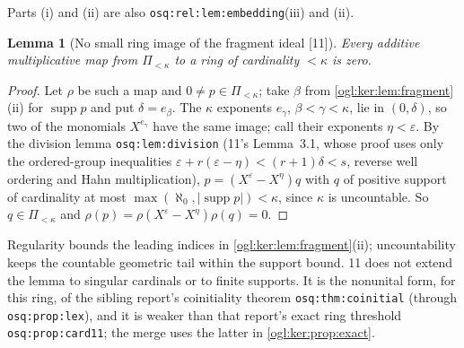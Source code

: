 \documentclass[11pt,oneside]{article}
\numberwithin{equation}{section}
\newtheorem{lemma}[lemma]{Lemma}
\theoremstyle{definition}
\theoremstyle{remark}
\newcommand{\supp}{\operatorname{supp}}
\newcommand{\src}[1]{\textup{\textsf{\small[#1]}}}
\newcommand{\replabel}[1]{\nolinkurl{#1}}
\begin{document}
Parts (i) and (ii) are also \replabel{osq:rel:lem:embedding}(iii) and (ii).

\begin{lemma}[No small ring image of the fragment ideal \src{11}]\label{ogl:ker:lem:fragmentring}
Every additive multiplicative map from $\Pi_{<\kappa}$ to a ring of cardinality
$<\kappa$ is zero.
\end{lemma}
\begin{proof}
Let $\rho$ be such a map and $0\ne p\in\Pi_{<\kappa}$; take $\beta$ from
\cref{ogl:ker:lem:fragment}(ii) for $\supp p$ and put $\delta=e_\beta$. The
$\kappa$ exponents $e_\gamma$, $\beta<\gamma<\kappa$, lie in $(0,\delta)$, so two
of the monomials $X^{e_\gamma}$ have the same image; call their exponents
$\eta<\varepsilon$. By the division lemma \replabel{osq:lem:division} (11's
Lemma~3.1, whose proof uses only the ordered-group inequalities
$\varepsilon+r(\varepsilon-\eta)<(r+1)\delta<s$, reverse well ordering and Hahn
multiplication), $p=(X^\varepsilon-X^\eta)q$ with $q$ of positive support of
cardinality at most $\max(\aleph_0,|\supp p|)<\kappa$, since $\kappa$ is
uncountable. So $q\in\Pi_{<\kappa}$ and $\rho(p)=\rho(X^\varepsilon-X^\eta)\rho(q)=0$.
\end{proof}

Regularity bounds the leading indices in \cref{ogl:ker:lem:fragment}(ii);
uncountability keeps the countable geometric tail within the support bound. 11
does not extend the lemma to singular cardinals or to finite supports. It is the
nonunital form, for this ring, of the sibling report's coinitiality theorem
\replabel{osq:thm:coinitial} (through \replabel{osq:prop:lex}), and it is
weaker than that report's exact ring threshold \replabel{osq:prop:card11}; the
merge uses the latter in \cref{ogl:ker:prop:exact}.
\end{document}
